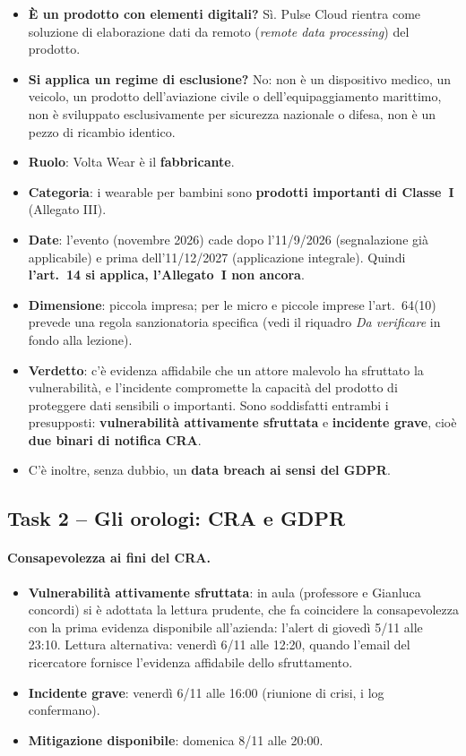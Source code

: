 \begin{itemize}
  \item \textbf{È un prodotto con elementi digitali?} Sì. Pulse Cloud rientra come soluzione di
    elaborazione dati da remoto (\emph{remote data processing}) del prodotto.
  \item \textbf{Si applica un regime di esclusione?} No: non è un dispositivo medico, un veicolo,
    un prodotto dell'aviazione civile o dell'equipaggiamento marittimo, non è sviluppato
    esclusivamente per sicurezza nazionale o difesa, non è un pezzo di ricambio identico.
  \item \textbf{Ruolo}: Volta Wear è il \textbf{fabbricante}.
  \item \textbf{Categoria}: i wearable per bambini sono \textbf{prodotti importanti di Classe~I}
    (Allegato III).
  \item \textbf{Date}: l'evento (novembre 2026) cade dopo l'11/9/2026 (segnalazione già applicabile)
    e prima dell'11/12/2027 (applicazione integrale). Quindi \textbf{l'art.~14 si applica,
    l'Allegato~I non ancora}.
  \item \textbf{Dimensione}: piccola impresa; per le micro e piccole imprese l'art.~64(10) prevede una
    regola sanzionatoria specifica (vedi il riquadro \emph{Da verificare} in fondo alla lezione).
  \item \textbf{Verdetto}: c'è evidenza affidabile che un attore malevolo ha sfruttato la
    vulnerabilità, e l'incidente compromette la capacità del prodotto di proteggere dati sensibili o
    importanti. Sono soddisfatti entrambi i presupposti: \textbf{vulnerabilità attivamente sfruttata}
    e \textbf{incidente grave}, cioè \textbf{due binari di notifica CRA}.
  \item C'è inoltre, senza dubbio, un \textbf{data breach ai sensi del GDPR}.
\end{itemize}

\subsection{Task 2 -- Gli orologi: CRA e GDPR}

\paragraph{Consapevolezza ai fini del CRA.}
\begin{itemize}
  \item \textbf{Vulnerabilità attivamente sfruttata}: in aula (professore e Gianluca concordi) si è
    adottata la lettura prudente, che fa coincidere la consapevolezza con la prima evidenza
    disponibile all'azienda: l'alert di giovedì 5/11 alle 23:10. Lettura alternativa: venerdì 6/11
    alle 12:20, quando l'email del ricercatore fornisce l'evidenza affidabile dello sfruttamento.
  \item \textbf{Incidente grave}: venerdì 6/11 alle 16:00 (riunione di crisi, i log confermano).
  \item \textbf{Mitigazione disponibile}: domenica 8/11 alle 20:00.
\end{itemize}

